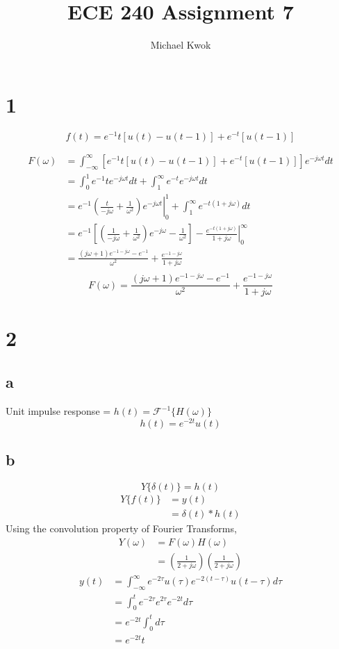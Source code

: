 \documentclass{article}
\title{ECE 240 Assignment 7}
\author{Michael Kwok}
\begin{document}
\maketitle
\begin{multicols}{2}
\section*{1}

$$f(t) = e^{-1} t \left[ u(t)-u(t-1) \right] + e^{-t}[u(t-1)]$$

\begin{align*}
    F(\omega) &= \int_{-\infty}^{\infty}\left[ e^{-1} t \left[ u(t)-u(t-1) \right] + e^{-t}[u(t-1)]\right]e^{-j\omega t}dt\\
    &= \int_0^1 e^{-1} t e^{-j\omega t} dt + \int_1^\infty e^{-t} e^{-j\omega t} dt\\
    &= e^{-1}\left.\left(\frac{t}{-j\omega} + \frac{1}{\omega^2}\right) e^{-j\omega t}\right\rvert^1_0 + \int_1^\infty e^{-t (1 +j\omega)} dt\\
    &= e^{-1}\left[\left(\frac{1}{-j\omega} + \frac{1}{\omega^2}\right) e^{-j\omega}-\frac{1}{\omega ^2}\right] - \left.\frac{e^{-t (1 +j\omega)}}{1+j\omega} \right\rvert^\infty_0\\
    &= \frac{(j\omega +1) e^{-1-j\omega}-e^{-1}}{\omega ^2} + \frac{e^{-1 -j\omega}}{1+j\omega}\\
    \end{align*}
$$
\boxed{F(\omega) = \frac{(j\omega +1) e^{-1-j\omega}-e^{-1}}{\omega ^2} + \frac{e^{-1 -j\omega}}{1+j\omega}}
$$
\section*{2}
\subsection*{a}
Unit impulse response = $h(t) = \mathcal{F}^{-1}\{H(\omega)\}$
$$
\boxed{h(t) = e^{-2t}u(t)}
$$
\subsection*{b}
$$
Y\{\delta(t)\} = h(t)
$$
\begin{align*}
    Y\{f(t)\} &= y(t)\\
    &= \delta(t)*h(t)
\end{align*}
Using the convolution property of Fourier Transforms,
\begin{align*}
    Y(\omega) &= F(\omega) H(\omega)\\
    &= \left( \frac{1}{2+j\omega} \right) \left( \frac{1}{2+j\omega} \right)
\end{align*}
\begin{align*}
    y(t) &= \int_{-\infty}^{\infty} e^{-2\tau} u(\tau) e^{-2(t-\tau)} u(t-\tau)d\tau\\
    &=\int_0^t e^{-2\tau}e^{2\tau} e^{-2t}d\tau\\
    &= e^{-2t}\int_0^t d\tau\\
    &= \boxed{e^{-2t} t}
\end{align*}

\end{multicols}
\end{document}
